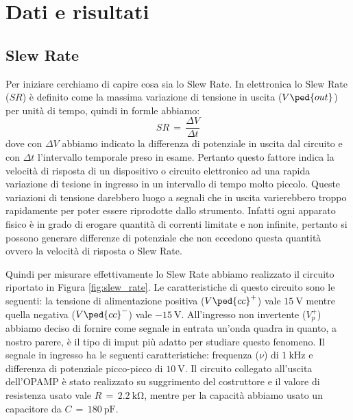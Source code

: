 \section*{Dati e risultati}

\subsection*{Slew Rate}

Per iniziare cerchiamo di capire cosa sia lo Slew Rate. In elettronica lo Slew Rate ($SR$) è definito come la massima variazione di tensione in uscita ($V\ped{out}$) per unità di tempo, quindi in formle abbiamo:
\begin{equation}
	SR\,=\,\frac{\Delta V}{\Delta t}
	\label{slew_rate_equation}
\end{equation}
dove con $\Delta V$ abbiamo indicato la differenza di potenziale in uscita dal circuito e con $\Delta t$ l'intervallo temporale preso in esame.
Pertanto questo fattore indica la velocità di risposta di un dispositivo o circuito elettronico ad una rapida variazione di tesione in ingresso in un intervallo di tempo molto piccolo. Queste variazioni di tensione darebbero luogo a segnali che in uscita varierebbero troppo rapidamente per poter essere riprodotte dallo strumento. Infatti ogni apparato fisico è in grado di erogare quantità di correnti limitate e non infinite, pertanto si possono generare differenze di potenziale che non eccedono questa quantità ovvero la velocità di risposta o Slew Rate.

Quindi per misurare effettivamente lo Slew Rate abbiamo realizzato il circuito riportato in Figura \ref{fig:slew_rate}. Le caratteristiche di questo circuito sono le seguenti: la tensione di alimentazione positiva ($V\ped{cc}^+$) vale $\SI{+15}{\volt}$ mentre quella negativa ($V\ped{cc}^-$) vale $\SI{-15}{\volt}$. All'ingresso non invertente ($V_p^+$) abbiamo deciso di fornire come segnale in entrata un'onda quadra in quanto, a nostro parere, è il tipo di imput più adatto per studiare questo fenomeno. Il segnale in ingresso ha le seguenti caratteristiche: frequenza ($\nu$) di $\SI{1}{\kilo\hertz}$ e differenza di potenziale picco-picco di $\SI{10}{\volt}$. Il circuito collegato all'uscita dell'OPAMP è stato realizzato su suggrimento del costruttore e il valore di resistenza usato vale $R\,=\,\SI{2.2}{\kilo\ohm}$, mentre per la capacità abbiamo usato un capacitore da $C\,=\,\SI{180}{\pico\farad}$.

